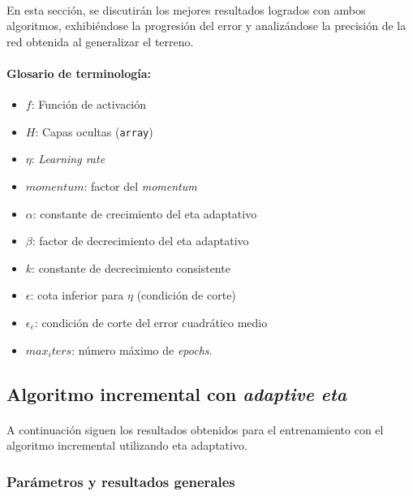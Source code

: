 \documentclass[12pt, twocolumn]{article}
\begin{document}
	\paragraph{} En esta sección, se discutirán los mejores resultados logrados con ambos algoritmos, exhibiéndose la progresión del error y analizándose la precisión de la red obtenida al generalizar el terreno.
	
	\paragraph{Glosario de terminología:}
	
	\begin{itemize}
		\item $f$: Función de activación
		\item $H$: Capas ocultas (\verb|array|)
		\item $\eta$: \textit{Learning rate}
		\item $momentum$: factor del \textit{momentum}
		\item $\alpha$: constante de crecimiento del eta adaptativo
		\item $\beta$: factor de decrecimiento del eta adaptativo
		\item $k$: constante de decrecimiento consistente
		\item $\epsilon$: cota inferior para $\eta$ (condición de corte)
		\item $\epsilon_{e}$: condición de corte del error cuadrático medio
		\item $max_iters$: número máximo de \textit{epochs}.
		
	\end{itemize}
	
	\subsection{Algoritmo incremental con \textit{adaptive eta}}
	
	\paragraph{} A continuación siguen los resultados obtenidos para el entrenamiento con el algoritmo incremental utilizando eta adaptativo.  
	
	\subsubsection{Parámetros y resultados generales} 
	
\end{document}
